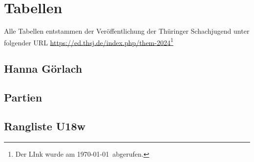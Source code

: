 \documentclass[a4paper,ngerman]{tui-algo-seminar}
\title{\inhalt}
\author{Erik Skopp}
\newcommand{\inhalt}{Thüringer Einzelmeisterschaft 2024}
\begin{document}
\maketitle
\thispagestyle{plain}
\begin{abstract}
    Bericht: \inhalt.\\
    Das erste Nikolaus Blitzturnier des Ilmenauer Schachvereins fand am 08.12.2023 statt. Es wurden 13 Runden mit einer Bedenkzeit von 5 Minuten gespielt. Platz 1 erreichte Andreas Neubauer von BW Stadtilm. Platz 2 ging an Pascal Eichenauer. Platz 3 ging an Ainur Ziganshin.
\end{abstract}



\section{Tabellen}
Alle Tabellen entstammen der Veröffentlichung der Thüringer Schachjugend unter folgender URL \url{https://ed.thsj.de/index.php/them-2024}\footnote{Der LInk wurde am \today ~abgerufen.}

\subsection{Hanna Görlach}
\subsection{Partien}

\subsection{Rangliste U18w}
\end{document}
